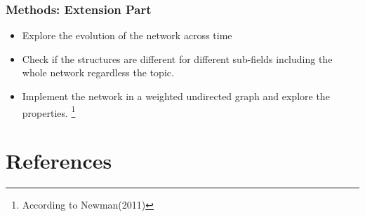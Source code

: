 \documentclass{beamer}
\begin{document}
\begin{frame}\frametitle{Methods: Extension Part}
	\begin{itemize}
		\item  Explore the evolution of the network across time
		\item  Check if the structures are different for different sub-fields including the whole network regardless the topic. 
		\item Implement the network in a weighted undirected graph and explore the properties. \footnote{According to Newman(2011)}
	\end{itemize}
\end{frame}

\section{References}
\begin{frame}
\end{frame}
\end{document}
